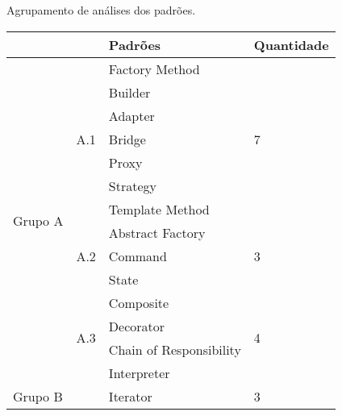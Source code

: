\begin{quadro}[htb]
    \caption{\label{resultados}Agrupamento de análises dos padrões.}
    \begin{tabular}{@{}llll@{}}
        \toprule
                                  &                            & Padrões                 & Quantidade         \\ \midrule
        \multirow{14}{*}{Grupo A} & \multirow{7}{*}{A.1} & Factory Method          & \multirow{7}{*}{7} \\
                                  &                            & Builder                 &                    \\
                                  &                            & Adapter                 &                    \\
                                  &                            & Bridge                  &                    \\
                                  &                            & Proxy                   &                    \\
                                  &                            & Strategy                &                    \\
                                  &                            & Template Method         &                    \\ \cmidrule(r){2-4}
                                  & \multirow{3}{*}{A.2} & Abstract Factory        & \multirow{3}{*}{3} \\
                                  &                            & Command                 &                    \\
                                  &                            & State                   &                    \\ \cmidrule(r){2-4}
                                  & \multirow{4}{*}{A.3} & Composite               & \multirow{4}{*}{4} \\
                                  &                            & Decorator               &                    \\
                                  &                            & Chain of Responsibility &                    \\
                                  &                            & Interpreter             &                    \\ \cmidrule(r){1-4}
        \multicolumn{2}{l}{\multirow{3}{*}{Grupo B}}           & Iterator                & \multirow{3}{*}{3} \\

\end{tabular}
\end{quadro}
